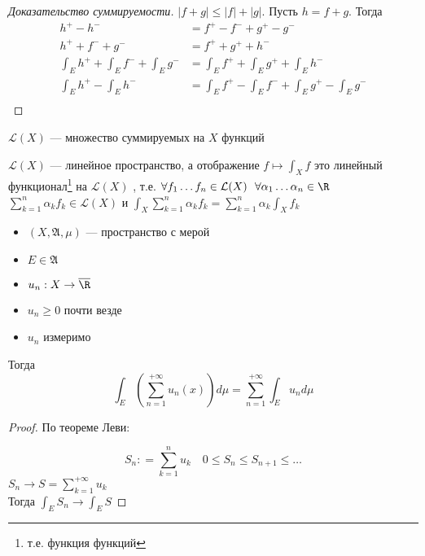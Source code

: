 \begin{proof}[Доказательство суммируемости]
    \(|f + g| \leq |f| + |g|\). Пусть \(h = f + g\). Тогда
    \begin{align*}
        h^{ +} - h^{ -}                                & = f^{ +} - f^{ -} + g^{ +} - g^{ -}                               \\
        h^{ +} + f^{ -} + g^{ - }                      & = f^{ + } + g^{ +} + h^{ -}                                       \\
        \int_E h^{ +} + \int_E f^{ -} + \int_E g^{ - } & = \int_E f^{ +} + \int_E g^{ +} + \int_E h^{ - }                  \\
        \int_E h^{ +} - \int_E h^{ - }                 & = \int_E f^{ +} - \int_E f^{ -} + \int_E g^{ + } - \int_E g^{ - } \\
    \end{align*}
\end{proof}
\begin{definition}
    \(\mathcal{L}(X)\) --- множество суммируемых на \(X\) функций
\end{definition}
\begin{corollary}[следствия]
    \(\mathcal{L}(X)\) --- линейное пространство, а отображение \(f \mapsto \int_X f\) это линейный функционал\footnote{т.е. функция функций} на \(\mathcal{L}(X)\)
    , т.е. \(\forall f_1 \dots f_n \in \mathcal{L}(X) \ \ \forall \alpha_1 \dots \alpha_n \in\R\) \\
    \(\sum\limits_{k = 1}^n\alpha_k f_k \in \mathcal{L}(X)\)\: и \:\(\int_X\sum\limits_{k = 1}^n\alpha_k f_k = \sum\limits_{k = 1}^n\alpha_k\int_X f_k\)
\end{corollary}

\begin{theorem}\itemfix
    \begin{itemize}
        \item \((X, \mathfrak{A}, \mu)\) --- пространство с мерой
        \item \(E\in \mathfrak{A}\)
        \item \(u_n : X \to \overline\R\)
        \item \(u_n \geq 0\) почти везде
        \item \(u_n\) измеримо
    \end{itemize}

    Тогда
    \[\int_E \left( \sum_{n = 1}^{+\infty} u_n(x) \right) d\mu = \sum_{n = 1}^{+\infty} \int_E u_n d\mu\]
\end{theorem}
\begin{proof}
    По теореме Леви:

    \[S_n : = \sum_{k = 1}^n u_k \quad 0 \leq S_n \leq S_{n+1} \leq \dots \]
    \(S_n \to S = \sum\limits_{k = 1}^{+\infty}u_k\)  \\
    Тогда \(\int_E S_n \to \int_E S\)
\end{proof}

